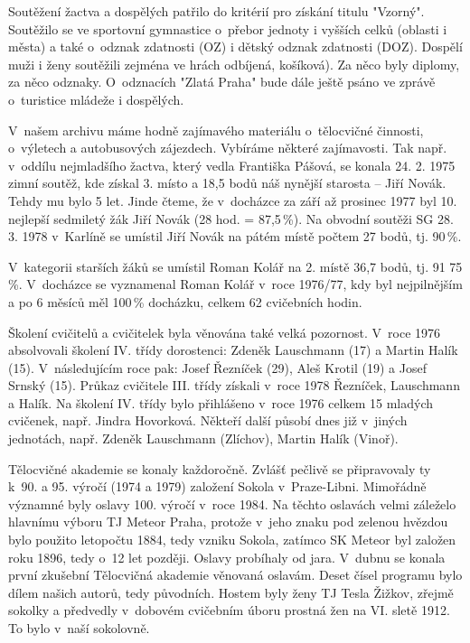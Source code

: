 \documentclass[a5paper, 11pt, twoside]{article}
\begin{document}
Soutěžení žactva a dospělých patřilo do kritérií pro získání titulu
"Vzorný". Soutěžilo se ve sportovní gymnastice o~přebor jednoty i
vyšších celků (oblasti i města) a také o~odznak zdatnosti (OZ) i dětský
odznak zdatnosti (DOZ). Dospělí muži i ženy soutěžili zejména ve hrách
odbíjená, košíková). Za něco byly diplomy, za něco odznaky. O~odznacích
"Zlatá Praha" bude dále ještě psáno ve zprávě o~turistice mládeže i
dospělých.

V~našem archivu máme hodně zajímavého materiálu o~tělocvičné činnosti,
o~výletech a autobusových zájezdech. Vybíráme některé zajímavosti. Tak
např. v~oddílu nejmladšího žactva, který vedla Františka Pášová, se
konala 24. 2. 1975 zimní soutěž, kde získal 3. místo a 18,5 bodů náš
nynější starosta -- Jiří Novák. Tehdy mu bylo 5 let. Jinde čteme, že
v~docházce za září až prosinec 1977 byl 10. nejlepší sedmiletý žák Jiří
Novák (28 hod. = 87,5\,\%). Na obvodní soutěži SG 28. 3. 1978 v~Karlíně
se umístil Jiří Novák na pátém místě počtem 27 bodů, tj. 90\,\%.

V~kategorii starších žáků se umístil Roman Kolář na 2. místě 36,7 bodů,
tj. 91 75 \%. V~docházce se vyznamenal Roman Kolář v~roce 1976/77, kdy
byl nejpilnějším a po 6 měsíců měl 100\,\% docházku, celkem 62 cvičebních
hodin.

Školení cvičitelů a cvičitelek byla věnována také velká pozornost.
V~roce 1976 absolvovali školení IV. třídy dorostenci: Zdeněk Lauschmann
(17) a Martin Halík (15). V~následujícím roce pak: Josef Řezníček (29),
Aleš Krotil (19) a Josef Srnský (15). Průkaz cvičitele III. třídy
získali v~roce 1978 Řezníček, Lauschmann a Halík. Na školení IV. třídy
bylo přihlášeno v~roce 1976 celkem 15 mladých cvičenek, např. Jindra
Hovorková. Někteří další působí dnes již v~jiných jednotách, např.
Zdeněk Lauschmann (Zlíchov), Martin Halík (Vinoř).

Tělocvičné akademie se konaly každoročně. Zvlášť pečlivě se připravovaly
ty k~90. a 95. výročí (1974 a 1979) založení Sokola v~Praze-Libni.
Mimořádně významné byly oslavy 100. výročí v~roce 1984. Na těchto
oslavách velmi záleželo hlavnímu výboru TJ Meteor Praha, protože v~jeho
znaku pod zelenou hvězdou bylo použito letopočtu 1884, tedy vzniku
Sokola, zatímco SK Meteor byl založen roku 1896, tedy o~12 let později.
Oslavy probíhaly od jara. V~dubnu se konala první zkušební Tělocvičná
akademie věnovaná oslavám. Deset čísel programu bylo dílem našich
autorů, tedy původních. Hostem byly ženy TJ Tesla Žižkov, zřejmě sokolky
a předvedly v~dobovém cvičebním úboru prostná žen na VI. sletě 1912. To
bylo v~naší sokolovně.
\end{document}
